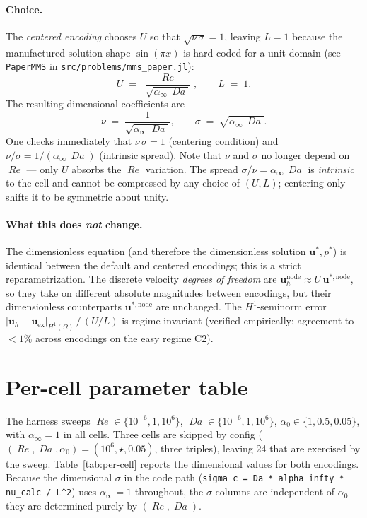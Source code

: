 \documentclass[11pt]{article}
\newcommand{\Reyn}{\operatorname{\mathit{Re}}}
\newcommand{\Damk}{\operatorname{\mathit{Da}}}
\begin{document}
\paragraph{Choice.}
The \emph{centered encoding} chooses $U$ so that
$\sqrt{\nu\,\sigma} = 1$, leaving $L = 1$ because the manufactured solution
shape $\sin(\pi x)$ is hard-coded for a unit domain (see
\texttt{PaperMMS} in \texttt{src/problems/mms\_paper.jl}):
\begin{equation}
  \boxed{\;\;
    U \;=\; \frac{\Reyn}{\sqrt{\alpha_\infty\,\Damk}},
    \qquad
    L \;=\; 1.
  \;\;}
\end{equation}
The resulting dimensional coefficients are
\begin{equation}
  \nu \;=\; \frac{1}{\sqrt{\alpha_\infty\,\Damk}},
  \qquad
  \sigma \;=\; \sqrt{\alpha_\infty\,\Damk}.
\end{equation}
One checks immediately that
$\nu\,\sigma = 1$ (centering condition) and
$\nu/\sigma = 1/(\alpha_\infty\,\Damk)$ (intrinsic spread).
Note that $\nu$ and $\sigma$ no longer depend on $\Reyn$ — only $U$ absorbs
the $\Reyn$ variation. The spread
$\sigma / \nu = \alpha_\infty\,\Damk$ is \emph{intrinsic} to the cell and
cannot be compressed by any choice of $(U, L)$; centering only shifts it
to be symmetric about unity.

\paragraph{What this does \emph{not} change.}
The dimensionless equation (and therefore the dimensionless solution
$\boldsymbol{u}^*, p^*$) is identical between the default and centered
encodings; this is a strict reparametrization. The discrete velocity
\emph{degrees of freedom} are
$\boldsymbol{u}_h^{\mathrm{node}} \approx U\,\boldsymbol{u}^{*,\mathrm{node}}$,
so they take on different absolute magnitudes between encodings, but their
dimensionless counterparts $\boldsymbol{u}^{*,\mathrm{node}}$ are unchanged.
The $H^1$-seminorm error
$|\boldsymbol{u}_h - \boldsymbol{u}_{\mathrm{ex}}|_{H^1(\Omega)}\,/\,(U/L)$
is regime-invariant (verified empirically: agreement to $<\!1\%$ across
encodings on the easy regime C2).

\section{Per-cell parameter table}

The harness sweeps $\Reyn \in \{10^{-6}, 1, 10^{6}\}$,
$\Damk \in \{10^{-6}, 1, 10^{6}\}$,
$\alpha_0 \in \{1, 0.5, 0.05\}$, with $\alpha_\infty = 1$ in all cells.
Three cells are skipped by config
($(\Reyn, \Damk, \alpha_0) = (10^{6}, \star, 0.05)$, three triples),
leaving 24 that are exercised by the sweep. Table~\ref{tab:per-cell}
reports the dimensional values for both encodings. Because the dimensional
$\sigma$ in the code path
(\texttt{sigma\_c = Da * alpha\_infty * nu\_calc / L\^{}2}) uses
$\alpha_\infty = 1$ throughout, the $\sigma$ columns are independent of
$\alpha_0$ — they are determined purely by $(\Reyn, \Damk)$.
\end{document}
